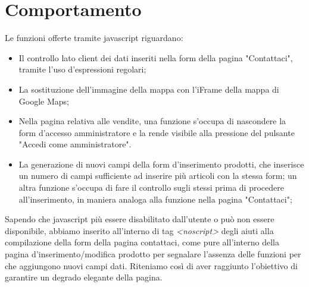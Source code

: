 \section{Comportamento}{
	Le funzioni offerte tramite javascript riguardano: 
	\begin{itemize}
		\item Il controllo lato client dei dati inseriti nella form della pagina "Contattaci", tramite l'uso d'espressioni regolari;
		\item La sostituzione dell'immagine della mappa con l'iFrame della mappa di Google Maps;
		\item Nella pagina relativa alle vendite, una funzione s'occupa di nascondere la form d'accesso amministratore e la rende visibile alla pressione del pulsante "Accedi come amministratore".
		\item La generazione di nuovi campi della form d'inserimento prodotti, che inserisce un numero di campi sufficiente ad inserire più articoli con la stessa form; un altra funzione s'occupa di fare il controllo sugli stessi prima di procedere all'inserimento, in maniera analoga alla funzione nella pagina "Contattaci";
	\end{itemize}%
	Sapendo che javascript più essere disabilitato dall'utente o può non essere disponibile, abbiamo inserito all'interno di tag \textit{<noscript>} degli aiuti alla compilazione della form della pagina contattaci, come pure all'interno della pagina d'inserimento/modifica prodotto per segnalare l'assenza delle funzioni per che aggiungono nuovi campi dati. Riteniamo così di aver raggiunto l'obiettivo di garantire un degrado elegante della pagina.
}